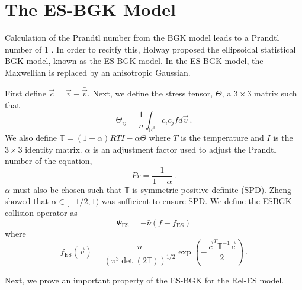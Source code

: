 \documentclass[12pt]{CSUNthesis}
\def\T{\mathbb{T}}
\def\R{\mathbb{R}}
\def\T{\mathbb{T}}
\def\R{\mathbb{R}}
\newcommand{\vecv}{\vec{v}}
\begin{document}
\section{The ES-BGK Model}
Calculation of the Prandtl number from the BGK model leads to a Prandtl number of 1 \cite{Struchtrup2005}. In order to recitfy this, Holway \cite{H66} proposed the ellipsoidal statistical BGK model, known as the ES-BGK model. In the ES-BGK model, the Maxwellian is replaced by an anisotropic Gaussian.

First define $\vec{c} = \vecv - \bar{\vecv}$. Next, we define the stress tensor, $\Theta$, a $3 \times 3$ matrix such that
\begin{equation}
\Theta_{ij} = \frac{1}{n} \int_{\R^3} c_i c_j f d\vecv \, .
\end{equation}
We also define $\T = (1-\alpha)RTI-\alpha \Theta$ where $T$ is the temperature and $I$ is the $3 \times 3$ identity matrix. $\alpha$ is an adjustment factor used to adjust the Prandtl number of the equation,
\begin{equation}
Pr = \frac{1}{1-\alpha} \, .
\end{equation}
$\alpha$ must also be chosen such that $\T$ is symmetric positive definite (SPD). Zheng \cite{ZhengY2004} showed that $\alpha \in [-1/2,1)$ was sufficient to ensure SPD. We define the ESBGK collision operator as 
\begin{equation}
\label{eq:esbgk}
\Psi_{\text{ES}} = - \bar{\nu}(f-f_{\text{ES}})
\end{equation}
where
\begin{equation}
f_{\text{ES}}(\vecv) = \frac{n}{(\pi^3 \det(2\T))^{1/2}} \exp(-\frac{\vec{c}^T \T^{-1} \vec{c}}{2}) \, .
\end{equation}

Next, we prove an important property of the ES-BGK for the Rel-ES model.
\end{document}
